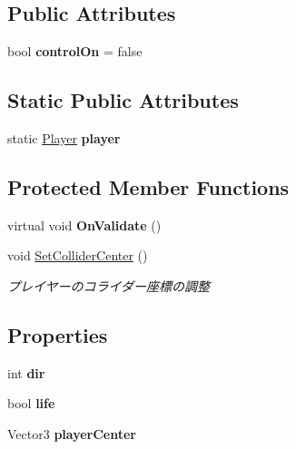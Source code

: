 \subsection*{Public Attributes}
\begin{DoxyCompactItemize}
\item 
\mbox{\label{class_player_a9440423bdfba23f83fa5f0abb921fa00}} 
bool {\bfseries control\+On} = false
\end{DoxyCompactItemize}
\subsection*{Static Public Attributes}
\begin{DoxyCompactItemize}
\item 
\mbox{\label{class_player_a626d7b1a0a69ccb17979ea7a0728fca7}} 
static \hyperlink{class_player}{Player} {\bfseries player}
\end{DoxyCompactItemize}
\subsection*{Protected Member Functions}
\begin{DoxyCompactItemize}
\item 
\mbox{\label{class_player_a63f14794946478b179054b27c2ce1cef}} 
virtual void {\bfseries On\+Validate} ()
\item 
void \hyperlink{class_player_a2a687463f122935a8b084231f0c919de}{Set\+Collider\+Center} ()
\begin{DoxyCompactList}\small\item\em プレイヤーのコライダー座標の調整 \end{DoxyCompactList}\end{DoxyCompactItemize}
\subsection*{Properties}
\begin{DoxyCompactItemize}
\item 
\mbox{\label{class_player_af91c4e98ee93befc5fee4918f35215e9}} 
int {\bfseries dir}
\item 
\mbox{\label{class_player_a8386e65cacb96e09412a6aea8fd677a2}} 
bool {\bfseries life}
\item 
\mbox{\label{class_player_ad6575300cb1a27c06e49bdf66dd28b0f}} 
Vector3 {\bfseries player\+Center}
\end{DoxyCompactItemize}

